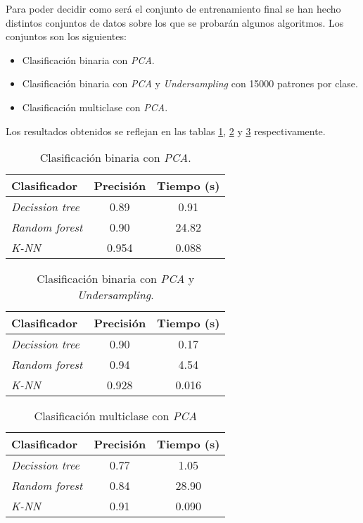 Para poder decidir como será el conjunto de entrenamiento final se han hecho distintos conjuntos de datos sobre los que se probarán algunos algoritmos. Los conjuntos son los siguientes:

\begin{itemize}
	\item Clasificación binaria con \textit{PCA}.
	\item Clasificación binaria con \textit{PCA} y \textit{Undersampling} con 15000 patrones por clase.
	\item Clasificación multiclase con \textit{PCA}.
\end{itemize}

Los resultados obtenidos se reflejan en las tablas \ref{tabla:binary_pca}, \ref{tabla:binary_under} y \ref{tabla:multi_pca} respectivamente.

\begin{table}[th]
	\centering
	\begin{tabular}{ |m{4cm}|c|c| }
		\hline
		\rowcolor{LightCyan}
		Clasificador & Precisión & Tiempo (s) \\
		\hline
		\textit{Decission tree} & 0.89  & 0.91  \\
		\textit{Random forest}  & 0.90  & 24.82 \\
		\textit{K-NN}           & 0.954 & 0.088 \\
		\hline
	\end{tabular}
	\caption{Clasificación binaria con \textit{PCA}.}
	\label{tabla:binary_pca}
\end{table}

\begin{table}[th]
	\centering
	\begin{tabular}{ |m{4cm}|c|c| }
		\hline
		\rowcolor{LightCyan}
		Clasificador & Precisión & Tiempo (s) \\
		\hline
		\textit{Decission tree} & 0.90  & 0.17  \\
		\textit{Random forest}  & 0.94  & 4.54  \\
		\textit{K-NN}           & 0.928 & 0.016 \\
		\hline
	\end{tabular}
	\caption{Clasificación binaria con \textit{PCA} y \textit{Undersampling}.}
	\label{tabla:binary_under}
\end{table}

\begin{table}[th]
	\centering
	\begin{tabular}{ |m{4cm}|c|c| }
		\hline
		\rowcolor{LightCyan}
		Clasificador & Precisión & Tiempo (s)  \\
		\hline
		\textit{Decission tree} & 0.77 & 1.05  \\
		\textit{Random forest}  & 0.84 & 28.90 \\
		\textit{K-NN}           & 0.91 & 0.090 \\
		\hline
	\end{tabular}
	\caption{Clasificación multiclase con \textit{PCA}}
	\label{tabla:multi_pca}
\end{table}

